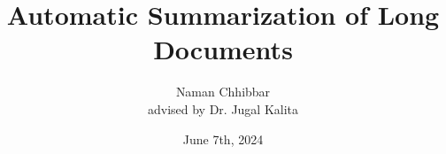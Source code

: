 \documentclass{beamer}
\title{Automatic Summarization of Long Documents}
\author[Naman Chhibbar]{
  Naman Chhibbar \\
  \scriptsize advised by Dr. Jugal Kalita
}
\institute{University of Colorado, Colorado Springs}
\date{June 7th, 2024}
\begin{document}
  \begin{frame}
    \titlepage
  \end{frame}

  
  
  
  
  
  
  
  
\end{document}
